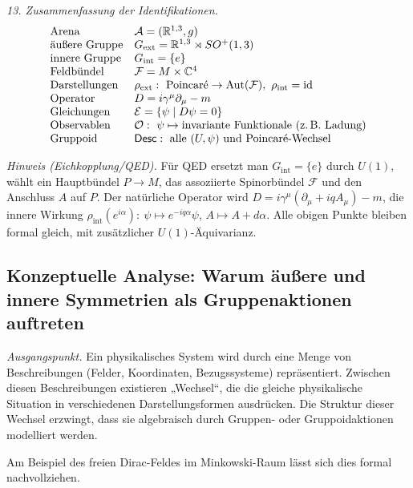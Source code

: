 \documentclass[10pt, letterpaper]{article}
\newcommand{\R}{\mathbb{R}}
\newcommand{\C}{\mathbb{C}}
\newcommand{\Aut}{\mathrm{Aut}}
\begin{document}
\medskip
\emph{13. Zusammenfassung der Identifikationen.}
\[
\begin{array}{ll}
\text{Arena} & \mathcal A=(\R^{1,3},g)\\
\text{äußere Gruppe} & G_{\mathrm{ext}}=\R^{1,3}\rtimes SO^+(1,3)\\
\text{innere Gruppe} & G_{\mathrm{int}}=\{e\}\\
\text{Feldbündel} & \mathcal F=M\times \C^4\\
\text{Darstellungen} & \rho_{\mathrm{ext}}:\ \text{Poincaré}\to \Aut(\mathcal F),\ \rho_{\mathrm{int}}=\mathrm{id}\\
\text{Operator} & D=i\gamma^\mu\partial_\mu - m\\
\text{Gleichungen} & \mathcal E=\{\psi\mid D\psi=0\}\\
\text{Observablen} & \mathcal O:\ \psi\mapsto \text{invariante Funktionale (z.\,B.\ Ladung)}\\
\text{Gruppoid} & \mathsf{Desc}:\ \text{alle }(U,\psi)\ \text{und Poincaré-Wechsel}
\end{array}
\]

\medskip
\emph{Hinweis (Eichkopplung/QED).}
Für QED ersetzt man \(G_{\mathrm{int}}=\{e\}\) durch \(U(1)\), wählt ein Hauptbündel
\(P\to M\), das assoziierte Spinorbündel \(\mathcal F\) und den Anschluss \(A\) auf \(P\).
Der natürliche Operator wird \(D=i\gamma^\mu(\partial_\mu + iq A_\mu) - m\),
die innere Wirkung \(\rho_{\mathrm{int}}(e^{i\alpha}):\ \psi\mapsto e^{-iq\alpha}\psi\),
\(A\mapsto A+d\alpha\). Alle obigen Punkte bleiben formal gleich, mit zusätzlicher
\(U(1)\)-Äquivarianz.


\pagebreak

\subsection{Konzeptuelle Analyse: Warum äußere und innere Symmetrien als Gruppenaktionen auftreten}

\emph{Ausgangspunkt.}
Ein physikalisches System wird durch eine Menge von Beschreibungen (Felder, Koordinaten, Bezugssysteme)
repräsentiert.  
Zwischen diesen Beschreibungen existieren „Wechsel“, die die gleiche physikalische Situation
in verschiedenen Darstellungsformen ausdrücken.
Die Struktur dieser Wechsel erzwingt, dass sie algebraisch durch Gruppen- oder Gruppoidaktionen
modelliert werden.  

Am Beispiel des freien Dirac-Feldes im Minkowski-Raum lässt sich dies formal nachvollziehen.
\end{document}
